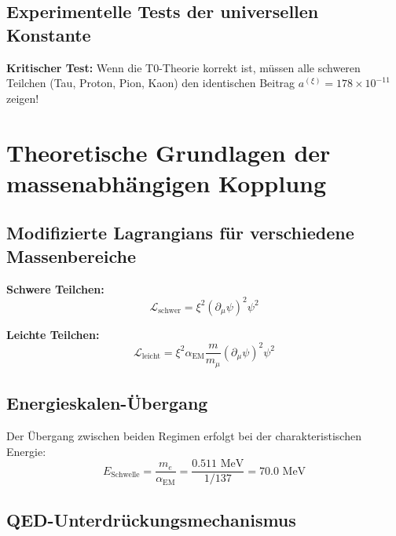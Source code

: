 \documentclass[12pt,a4paper]{article}
\newcommand{\xipar}{\xi}
\newcommand{\alphaEM}{\alpha_{\text{EM}}}
\begin{document}
	\subsection{Experimentelle Tests der universellen Konstante}
	
	\begin{erfolg}
		\textbf{Kritischer Test:} Wenn die T0-Theorie korrekt ist, müssen alle schweren Teilchen (Tau, Proton, Pion, Kaon) den identischen Beitrag $a^{(\xipar)} = 178 \times 10^{-11}$ zeigen!
	\end{erfolg}
	
	\section{Theoretische Grundlagen der massenabhängigen Kopplung}
	
	\subsection{Modifizierte Lagrangians für verschiedene Massenbereiche}
	
	\begin{formel}
		\textbf{Schwere Teilchen:}
		\begin{equation}
			\mathcal{L}_{\text{schwer}} = \xipar^2 (\partial_\mu \psi)^2 \psi^2
		\end{equation}
		
		\textbf{Leichte Teilchen:}
		\begin{equation}
			\mathcal{L}_{\text{leicht}} = \xipar^2 \alphaEM \frac{m}{m_\mu} (\partial_\mu \psi)^2 \psi^2
		\end{equation}
	\end{formel}
	
	\subsection{Energieskalen-Übergang}
	
	Der Übergang zwischen beiden Regimen erfolgt bei der charakteristischen Energie:
	\begin{equation}
		E_{\text{Schwelle}} = \frac{m_e}{\alphaEM} = \frac{0.511 \text{ MeV}}{1/137} = 70.0 \text{ MeV}
	\end{equation}
	
	\subsection{QED-Unterdrückungsmechanismus}
	
\end{document}
